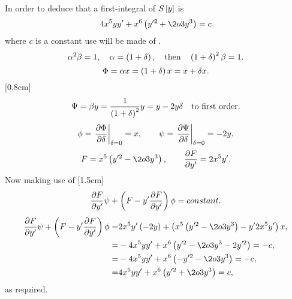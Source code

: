 \def\a2b{\alpha^2\beta}
In order to deduce that a first-integral of $S\left[{y}\right]$ is
\[
	4x^5y y^\prime + x^6\lr{y^{\prime2} + \2o3 y^3} = c
\]
where $c$ is a constant use will be made of \nt.
\[
	\a2b = 1,\quad \alpha=\lr{1+\delta},\quad \textrm{then}\quad \lr{1+\delta}^2\beta=1.
\]
\[
	\Phi = \alpha x = \left(1+\delta\right) x = x + \delta x.
\]
[0.8cm]
\[
	\Psi = \beta y = \frac{1}{\left(1+\delta\right)^2}y = y-2y\delta\quad \textrm{to first order}.
\]
\[
	\phi =\left. \frac{\partial \Phi}{\partial \delta} \right| _{\delta=0} = x,\qquad \psi = \left. \frac{\partial \Psi}{\partial \delta} \right| _{\delta=0} = -2y.
\]
\[
	F = x^5\lr{y^{\prime2} - \2o3 y^3},\qquad \pderiv{F}{y^\prime} = 2x^5 y^\prime.
\]
Now making use of \nt{}[1.5cm]
\[
	\frac{\partial F}{\partial y^\prime}\psi + \left(F - y^\prime \frac{\partial F}{\partial y^\prime}\right)\phi = constant.
\]
\begin{align*}
	\pderiv{F}{y^\prime}\psi + \lr{F - y^\prime \pderiv{F}{y^\prime}}\phi =& 2x^5 y^\prime\lr{-2y} + \lr{ x^5\lr{y^{\prime2} - \2o3 y^3} - y^\prime 2x^5 y^\prime}x,\\
	=& -4 x^5yy^\prime + x^6\lr{y^{\prime2}-\2o3 y^3 - 2y^{\prime2}} = -c,\\
	=& -4 x^5yy^\prime + x^6\lr{-y^{\prime2}-\2o3 y^3} = -c,\\
	=& 4 x^5yy^\prime + x^6\lr{y^{\prime2}+\2o3 y^3} = c,
\end{align*}
as required.